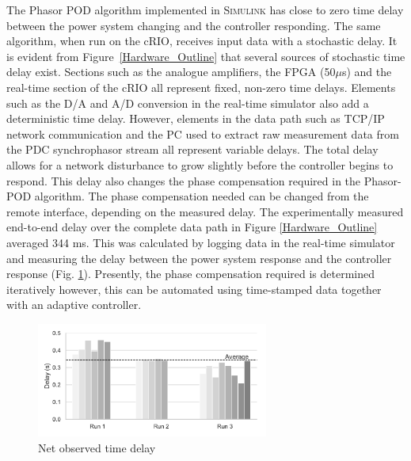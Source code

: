 \documentclass[journal]{IEEEtran}
\begin{document}
The Phasor POD algorithm implemented in \textsc{Simulink} has close to zero time delay between the power system changing and the controller responding. The same algorithm, when run on the cRIO, receives input data with a stochastic delay. It is evident from Figure~\ref{Hardware_Outline} that several sources of stochastic time delay exist. Sections such as the analogue amplifiers, the FPGA (50$\mu$s) and the real-time section of the cRIO all represent fixed, non-zero time delays. Elements such as the D/A and A/D conversion in the real-time simulator also add a deterministic time delay. However, elements in the data path such as TCP/IP network communication and the PC used to extract raw measurement data from the PDC synchrophasor stream all represent variable delays. The total delay allows for a network disturbance to grow slightly before the controller begins to respond. This delay also changes the phase compensation required in the Phasor-POD algorithm. The phase compensation needed can be changed from the remote interface, depending on the measured delay. The experimentally measured end-to-end delay over the complete data path in Figure \ref{Hardware_Outline} averaged 344 ms. This was calculated by logging data in the real-time simulator and measuring the delay between the power system response and the controller response (Fig. \ref{varying_time_delay}). Presently, the phase compensation required is determined iteratively however, this can be automated using time-stamped data together with an adaptive controller.

\begin{figure}[thpb]
\centering
\includegraphics[width=3in]{delay_bar_chart.pdf}
\caption{Net observed time delay}
\label{varying_time_delay}
\vspace{-1em}
\end{figure}
\end{document}
